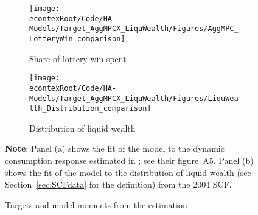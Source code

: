\documentclass[\econtexRoot/HAFiscal]{subfiles}
\begin{document}
\begin{figure}[htb]
  \centering
  \begin{subfigure}[b]{.48\linewidth}
    \centering
    \texttt{[image: \\econtexRoot/Code/HA-Models/Target\_AggMPCX\_LiquWealth/Figures/AggMPC\_LotteryWin\_comparison]}
    \caption{Share of lottery win spent}
    \notinsubfile{\label{fig:aggmpclotterywin}}
  \end{subfigure}
  \begin{subfigure}[b]{.48\linewidth}
    \centering
    \texttt{[image: \\econtexRoot/Code/HA-Models/Target\_AggMPCX\_LiquWealth/Figures/LiquWealth\_Distribution\_comparison]}
    \caption{Distribution of liquid wealth}
    \notinsubfile{\label{fig:liquwealthdistribution}}
  \end{subfigure}%
  \caption{Targets and model moments from the estimation}
  \notinsubfile{\label{fig:splurge_estimation}}
  \parbox{16cm}{\small \vspace{.15cm} \textbf{Note}: Panel (a) shows the fit of the model to the dynamic consumption response estimated in \citet{fagereng_mpc_2021}; see their figure~A5. Panel (b) shows the fit of the model to the distribution of liquid wealth (see Section~\ref{sec:SCFdata} for the definition) from the 2004 SCF.\normalsize}
\end{figure}


\end{document}
